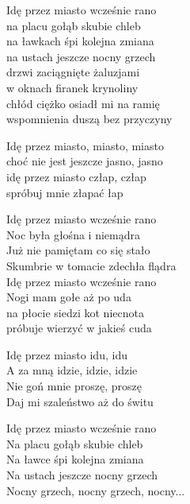 \begin{text}
    Idę przez miasto wcześnie rano\\
    na placu gołąb skubie chleb\\
    na ławkach śpi kolejna zmiana\\
    na ustach jeszcze nocny grzech\\
    drzwi zaciągnięte żaluzjami\\
    w oknach firanek krynoliny\\
    chłód ciężko osiadł mi na ramię\\
    wspomnienia duszą bez przyczyny

    Idę przez miasto, miasto, miasto\\
    choć nie jest jeszcze jasno, jasno\\
    idę przez miasto człap, człap\\
    spróbuj mnie złapać łap

    Idę przez miasto wcześnie rano\\
    Noc była głośna i niemądra\\
    Już nie pamiętam co się stało\\
    Skumbrie w tomacie zdechła flądra\\
    Idę przez miasto wcześnie rano\\
    Nogi mam gołe aż po uda\\
    na płocie siedzi kot niecnota\\
    próbuje wierzyć w jakieś cuda

    Idę przez miasto idu, idu\\
    A za mną idzie, idzie, idzie\\
    Nie goń mnie proszę, proszę\\
    Daj mi szaleństwo aż do świtu

    Idę przez miasto wcześnie rano\\
    Na placu gołąb skubie chleb\\
    Na ławce śpi kolejna zmiana\\
    Na ustach jeszcze nocny grzech\\
    Nocny grzech, nocny grzech, nocny...
\end{text}
\begin{chord}

\end{chord}